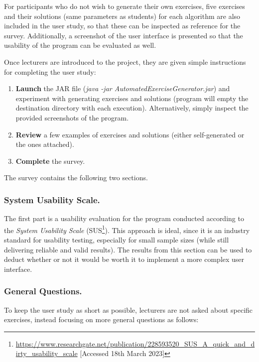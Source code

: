 \documentclass{l4proj}
\begin{document}
For participants who do not wish to generate their own exercises, five exercises and their solutions (same parameters as students) for each algorithm are also included in the user study, so that these can be inspected as reference for the survey. Additionally, a screenshot of the user interface is presented so that the usability of the program can be evaluated as well.

Once lecturers are introduced to the project, they are given simple instructions for completing the user study:
\begin{enumerate}
	\item
	\textbf{Launch} the JAR file (\emph{java -jar AutomatedExerciseGenerator.jar}) and experiment with generating exercises and solutions (program will empty the destination directory with each execution). Alternatively, simply inspect the provided screenshots of the program.
	\item
	\textbf{Review} a few examples of exercises and solutions (either self-generated or the ones attached).
	\item
	\textbf{Complete} the survey.
\end{enumerate}

The survey contains the following two sections.

\subsubsection{System Usability Scale.}

The first part is a usability evaluation for the program conducted according to the \emph{System Usability Scale} (SUS\footnote{\url{https://www.researchgate.net/publication/228593520_SUS_A_quick_and_dirty_usability_scale} [Accessed 18th March 2023]}). This approach is ideal, since it is an industry standard for usability testing, especially for small sample sizes (while still delivering reliable and valid results). The results from this section can be used to deduct whether or not it would be worth it to implement a more complex user interface.

\subsubsection{General Questions.}

To keep the user study as short as possible, lecturers are not asked about specific exercises, instead focusing on more general questions as follows:
\end{document}
